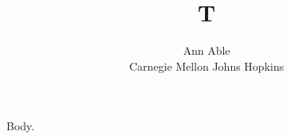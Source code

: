 \documentclass{article}
\begin{document}
\title{T}
\author{Ann Able\\ Carnegie Mellon \quad Johns Hopkins}
\maketitle
Body.
\end{document}
